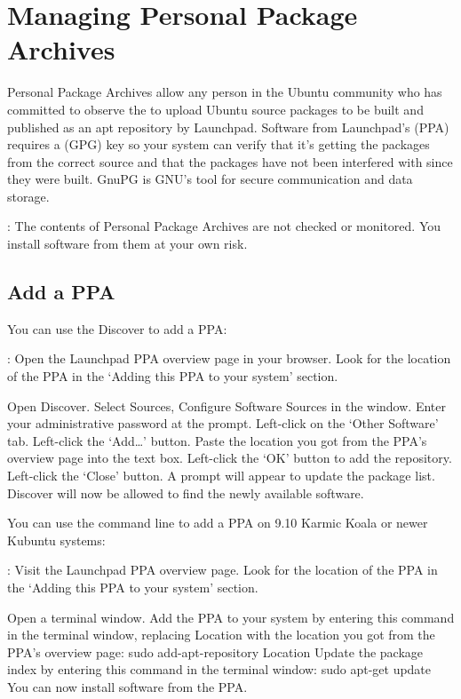 \documentclass[letterpaper,10pt,english]{sphinxmanual}
\begin{document}
\section{Managing Personal Package Archives}
\label{\detokenize{docs/repositories:managing-personal-package-archives}}\label{\detokenize{docs/repositories:ppa-link}}
Personal Package Archives allow any person in the Ubuntu community who has committed to observe the  to upload Ubuntu source packages to be built and published as an apt repository by Launchpad. Software from Launchpad’s  (PPA) requires a  (GPG) key so your system can verify that it’s getting the packages from the correct source and that the packages have not been interfered with since they were built. GnuPG is GNU’s tool for secure communication and data storage.

: The contents of Personal Package Archives are not checked or monitored. You install software from them at your own risk.


\subsection{Add a PPA}
\label{\detokenize{docs/repositories:add-a-ppa}}
You can use the Discover to add a PPA:

: Open the Launchpad PPA overview page in your browser. Look for the location of the PPA in the ‘Adding this PPA to your system’ section.

Open Discover. Select Sources, Configure Software Sources in the window. Enter your administrative password at the prompt. Left-click on the ‘Other Software’ tab. Left-click the ‘Add…’ button. Paste the location you got from the PPA’s overview page into the text box. Left-click the ‘OK’ button to add the repository. Left-click the ‘Close’ button. A prompt will appear to update the package list. Discover will now be allowed to find the newly available software.

You can use the command line to add a PPA on 9.10 Karmic Koala or newer Kubuntu systems:

: Visit the Launchpad PPA overview page. Look for the location of the PPA in the ‘Adding this PPA to your system’ section.

Open a terminal window. Add the PPA to your system by entering this command in the terminal window, replacing Location with the location you got from the PPA’s overview page: sudo add-apt-repository Location Update the package index by entering this command in the terminal window: sudo apt-get update You can now install software from the PPA.
\end{document}
